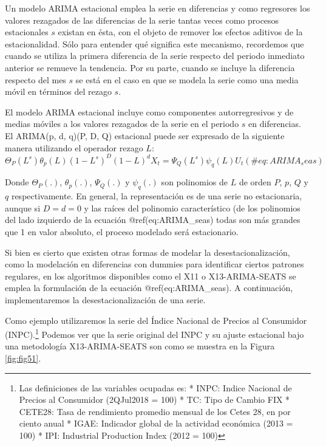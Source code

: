 \documentclass[
]{book}
\begin{document}
Un modelo ARIMA estacional emplea la serie en diferencias y como regresores los valores rezagados de las diferencias de la serie tantas veces como procesos estacionales \(s\) existan en ésta, con el objeto de remover los efectos aditivos de la estacionalidad. Sólo para entender qué significa este mecanismo, recordemos que cuando se utiliza la primera diferencia de la serie respecto del periodo inmediato anterior se remueve la tendencia. Por su parte, cuando se incluye la diferencia respecto del mes \(s\) se está en el caso en que se modela la serie como una media móvil en términos del rezago \(s\).

El modelo ARIMA estacional incluye como componentes autorregresivos y de medias móviles a los valores rezagados de la serie en el periodo \(s\) en diferencias. El ARIMA(p, d, q)(P, D, Q) estacional puede ser expresado de la siguiente manera utilizando el operador rezago \(L\):
\begin{equation}
    \Theta_P(L^s) \theta_p(L) (1 - L^s)^D (1 - L)^d X_t = \Psi_Q(L^s) \psi_q(L) U_t
    (\#eq:ARIMA_seas)
\end{equation}

Donde \(\Theta_P(.)\), \(\theta_p(.)\), \(\Psi_Q(.)\) y \(\psi_q(.)\) son polinomios de \(L\) de orden \(P\), \(p\), \(Q\) y \(q\) respectivamente. En general, la representación es de una serie no estacionaria, aunque si \(D = d = 0\) y las raíces del polinomio característico (de los polinomios del lado izquierdo de la ecuación @ref(eq:ARIMA\_seas) todas son más grandes que 1 en valor absoluto, el proceso modelado será estacionario.

Si bien es cierto que existen otras formas de modelar la desestacionalización, como la modelación en diferencias con dummies para identificar ciertos patrones regulares, en los algoritmos disponibles como el X11 o X13-ARIMA-SEATS se emplea la formulación de la ecuación @ref(eq:ARIMA\_seas). A continuación, implementaremos la desestacionalización de una serie.

Como ejemplo utilizaremos la serie del Índice Nacional de Precios al Consumidor (INPC).\footnote{Las definiciones de las variables ocupadas es:
* INPC: Indice Nacional de Precios al Consumidor (2QJul2018 = 100)
* TC: Tipo de Cambio FIX 
* CETE28: Tasa de rendimiento promedio mensual de los Cetes 28, en por ciento anual
* IGAE: Indicador global de la actividad económica (2013 = 100)
* IPI: Industrial Production Index (2012 = 100)
} Podemos ver que la serie original del INPC y su ajuste estacional bajo una metodología X13-ARIMA-SEATS son como se muestra en la Figura \ref{fig:fig51}.
\end{document}
